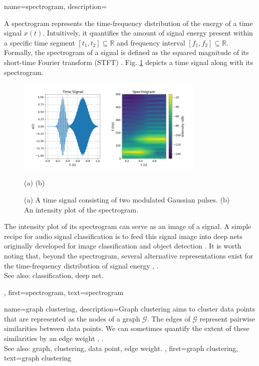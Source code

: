 {
{name={spectrogram},
	description={A spectrogram represents the time-frequency distribution of the energy of a time signal $x(t)$.  
		Intuitively, it quantifies the amount of signal energy present within a specific time segment 
		$[t_{1},t_{2}] \subseteq \mathbb{R}$ and frequency interval $[f_{1},f_{2}]\subseteq \mathbb{R}$. 
		Formally, the spectrogram of a signal is defined as the squared magnitude of its 
		short-time Fourier transform (STFT) \cite{cohen1995time}.
        		Fig. \ref{fig:spectrogram_dict} depicts a time signal along with its spectrogram. 
		\begin{figure}[H]
			\centering
			\includegraphics[width=0.8\textwidth]{assets/spectrogram.png}
			\begin{minipage}{\textwidth}
				\vspace{3ex}
				\centering
				{\selectfont (a) \hspace{10em} (b)}
			\end{minipage}
			\caption{(a) A time signal consisting of two modulated Gaussian pulses. (b) An intensity 
			plot of the spectrogram.
			\label{fig:spectrogram_dict}}
		\end{figure}
        		The intensity plot of its spectrogram can serve as an image of a signal. A 
		simple recipe for audio signal classification is to feed this signal image 
		into deep nets originally developed for image classification and object detection \cite{Li:2022aa}. 
		It is worth noting that, beyond the spectrogram, several alternative representations exist 
		for the time-frequency distribution of signal energy \cite{TimeFrequencyAnalysisBoashash}, \cite{MallatBook}.
					\\ 
		See also: classification, deep net.}, 
	first={spectrogram},
	text={spectrogram} 
}

{name={graph clustering},
	description={Graph clustering aims to 
		cluster data points that are represented as the nodes 
		of a graph $\mathcal{G}$. The edges of $\mathcal{G}$ represent 
		pairwise similarities between data points. We can sometimes
		quantify the extent of these similarities by an edge weight \cite{FlowSpecClustering2021}, \cite{Luxburg2007}.
					\\ 
		See also: graph, clustering, data point, edge weight. }, 
	first={graph clustering},
	text={graph clustering} 
}

}
